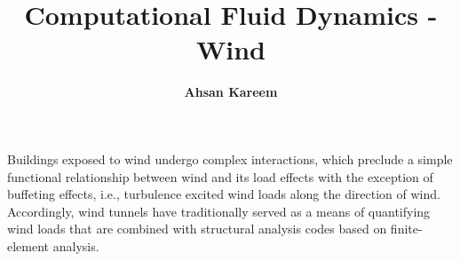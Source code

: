 %
%
%


%
%
%
%
%
%
%
%

\title{Computational Fluid Dynamics - Wind}
\author{
    \textbf{Ahsan Kareem}}
\tocauthor{}
%
%
\maketitle

Buildings exposed to wind undergo complex interactions, which preclude a simple functional relationship between wind and its load effects with the exception of buffeting effects, i.e., turbulence excited wind loads along the direction of wind. Accordingly, wind tunnels have traditionally served as a means of quantifying wind loads that are combined with structural analysis codes based on finite-element analysis. 

